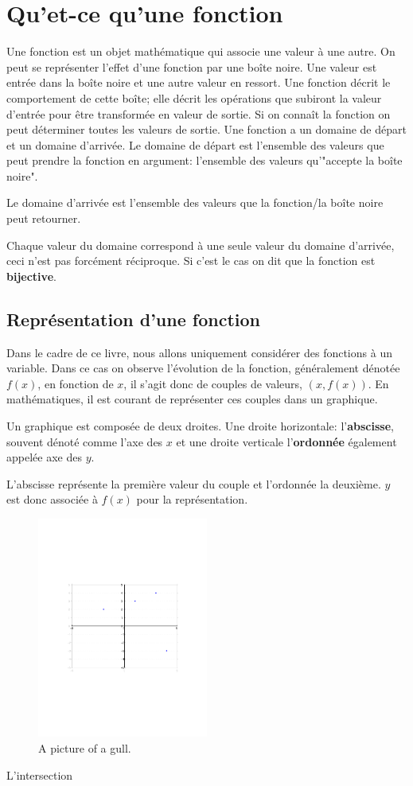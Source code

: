 \chapter{Qu'et-ce qu'une fonction}
Une fonction est un objet mathématique qui associe une valeur à une autre. On peut se représenter l'effet d'une fonction par une boîte noire. Une valeur est entrée dans la boîte noire et une autre valeur en ressort. Une fonction décrit le comportement de cette boîte; elle décrit les opérations que subiront la valeur d'entrée pour être transformée en valeur de sortie. Si on connaît la fonction on peut déterminer toutes les valeurs de sortie. 
Une fonction a un domaine de départ et un domaine d'arrivée. Le domaine de départ est l'ensemble des valeurs que peut prendre la fonction en argument: l'ensemble des valeurs qu'"accepte la boîte noire".

Le domaine d'arrivée est l'ensemble des valeurs que la fonction/la boîte noire peut retourner.

Chaque valeur du domaine correspond à une seule valeur du domaine d'arrivée, %
ceci n'est pas forcément réciproque. Si c'est le cas on dit que la fonction est \textbf{bijective}.%

\section{Représentation d'une fonction}
Dans le cadre de ce livre, nous allons uniquement considérer des fonctions à un variable. Dans ce cas on observe l'évolution de la fonction, généralement dénotée $f(x)$, en fonction de $x$, il s'agit donc de couples de valeurs, $(x,f(x))$. En mathématiques, il est courant de représenter ces couples dans un graphique.

Un graphique est composée de deux droites.
Une droite horizontale: l'\textbf{abscisse}, souvent dénoté comme l'axe des $x$ et une droite verticale l'\textbf{ordonnée} également appelée axe des $y$.

L'abscisse représente la première valeur du couple et l'ordonnée la deuxième. $y$ est donc associée à $f(x)$ pour la représentation.
\begin{figure}[h!]
  \caption{A picture of a gull.}
  \centering
    \includegraphics[width=0.5\textwidth]{matlab/es}
\end{figure}


L'intersection